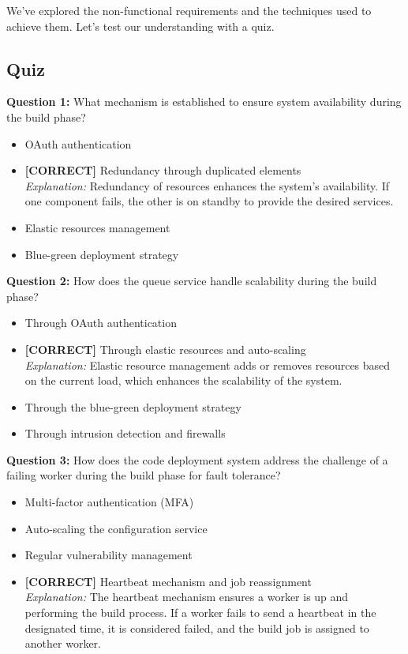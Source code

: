 We've explored the non-functional requirements and the techniques used to achieve them. Let's test our understanding with a quiz.

\subsection*{Quiz}
\vspace{0.3cm}
\noindent
\textbf{Question 1:} What mechanism is established to ensure system availability during the build phase?
\\[0.2cm]
\begin{itemize}
 \item OAuth authentication
 \item \textbf{[CORRECT]} Redundancy through duplicated elements
\\[0.1cm]
\textit{Explanation:} 
Redundancy of resources enhances the system's availability. If one component fails, the other is on standby to provide the desired services.
 \item Elastic resources management
 \item Blue-green deployment strategy
\end{itemize}
\vspace{0.3cm}
\noindent
\textbf{Question 2:} How does the queue service handle scalability during the build phase?
\\[0.2cm]
\begin{itemize}
 \item Through OAuth authentication
 \item \textbf{[CORRECT]} Through elastic resources and auto-scaling
\\[0.1cm]
\textit{Explanation:} 
Elastic resource management adds or removes resources based on the current load, which enhances the scalability of the system.
 \item Through the blue-green deployment strategy
 \item Through intrusion detection and firewalls
\end{itemize}
\vspace{0.3cm}
\noindent
\textbf{Question 3:} How does the code deployment system address the challenge of a failing worker during the build phase for fault tolerance?
\\[0.2cm]
\begin{itemize}
 \item Multi-factor authentication (MFA)
 \item Auto-scaling the configuration service
 \item Regular vulnerability management
 \item \textbf{[CORRECT]} Heartbeat mechanism and job reassignment
\\[0.1cm]
\textit{Explanation:} 
The heartbeat mechanism ensures a worker is up and performing the build process. If a worker fails to send a heartbeat in the designated time, it is considered failed, and the build job is assigned to another worker.
\end{itemize}

